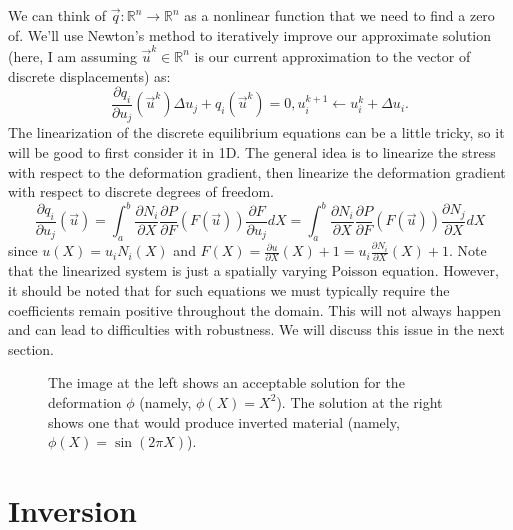 We can think of $\vec{q} : \mathbb{R}^n \to \mathbb{R}^n$ as a nonlinear function that we need to find a zero of. We'll use Newton's method to iteratively improve our approximate solution (here, I am assuming $\vec{u}^k \in \mathbb{R}^n$ is our current approximation to the vector of discrete displacements) as:
\begin{subequations}
\begin{equation*}
\frac{\partial q_i}{\partial u_j} \left( \vec{u}^k \right) \Delta{u}_j + q_i \left( \vec{u}^k \right) = 0,
\end{equation*}
\begin{equation*}
u_i^{k+1} \leftarrow u_i^{k} + \Delta{u}_i.
\end{equation*}
\end{subequations}
The linearization of the discrete equilibrium equations can be a little tricky, so it will be good to first consider it in 1D. The general idea is to linearize the stress with respect to the deformation gradient, then linearize the deformation gradient with respect to discrete degrees of freedom.
\begin{equation*}
\frac{\partial q_i}{\partial u_j} \left( \vec{u} \right) = \int_a^b \frac{\partial N_i}{\partial X} \frac{\partial P}{\partial F} \left( F \left( \vec{u} \right) \right) \frac{\partial F}{\partial u_j} dX = \int_a^b \frac{\partial N_i}{\partial X} \frac{\partial P}{\partial F} \left( F \left( \vec{u} \right) \right) \frac{\partial N_j}{\partial X} dX
\end{equation*}
since $u(X) = u_i N_i(X)$ and $F(X) = \frac{\partial u}{\partial X}(X) + 1 = u_i \frac{\partial N_i}{\partial X}(X) + 1$. Note that the linearized system is just a spatially varying Poisson equation. However, it should be noted that for such equations we must typically require the coefficients remain positive throughout the domain. This will not always happen and can lead to difficulties with robustness. We will discuss this issue in the next section.

\begin{figure}
\caption{The image at the left shows an acceptable solution for the deformation $\phi$ (namely, $\phi(X) = X^2$). The solution at the right shows one that would produce inverted material (namely, $\phi(X) = \sin \left( 2 \pi X \right)$).}
\label{fig:inversion}
\end{figure}

\section*{Inversion}

